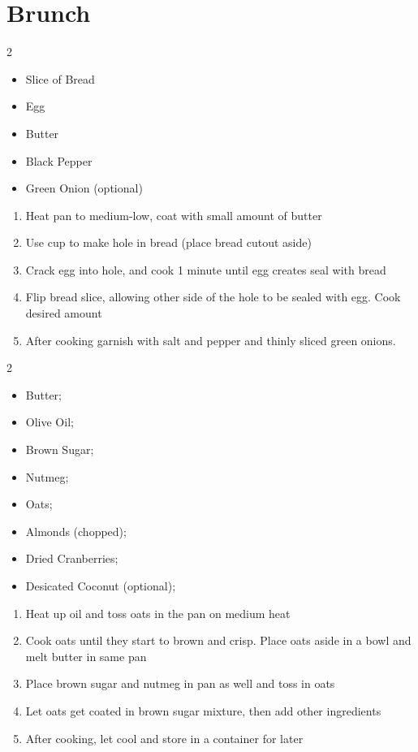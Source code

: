 \documentclass[oneside]{recipe}
\newcommand{\recipecolumn}[2]{
	\begin{multicols}{2}
	\raggedcolumns
	#1
	\columnbreak
	#2
	\end{multicols}
}
\begin{document}
\chapter{Brunch}
\recipecolumn{
	\begin{itemize}
		\item Slice of Bread
		\item Egg
		\item Butter
		\item Black Pepper
		\item Green Onion (optional)
	\end{itemize}
}{
	\begin{enumerate}
		\item Heat pan to medium-low, coat with small amount of butter
		\item Use cup to make hole in bread (place bread cutout aside)
		\item Crack egg into hole, and cook 1 minute until egg creates seal with bread
		\item Flip bread slice, allowing other side of the hole to be sealed with egg. Cook desired amount
		\item After cooking garnish with salt and pepper and thinly sliced green onions.
	\end{enumerate}
}

\recipecolumn{
	\begin{itemize}
		\item Butter;
		\item Olive Oil;
		\item Brown Sugar;
		\item Nutmeg;
		\item Oats;
		\item Almonds (chopped);
		\item Dried Cranberries;
		\item Desicated Coconut (optional);
	\end{itemize}
}{
	\begin{enumerate}
		\item Heat up oil and toss oats in the pan on medium heat
		\item Cook oats until they start to brown and crisp. Place oats aside in a bowl and melt butter in same pan
		\item Place brown sugar and nutmeg in pan as well and toss in oats
		\item Let oats get coated in brown sugar mixture, then add other ingredients
		\item After cooking, let cool and store in a container for later
	\end{enumerate}
}
\end{document}
